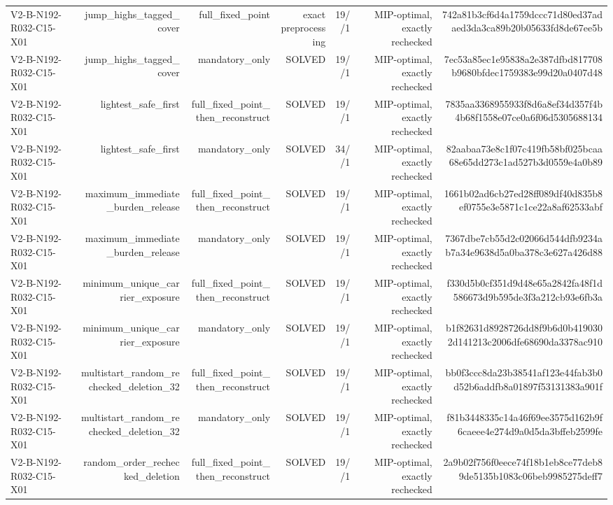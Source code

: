 {\begin{longtable}{lrrrrrr}
V2-B-N192-R032-C15-X01 & jump\_highs\_tagged\_cover & full\_fixed\_point & exact preprocessing & 19//1 & MIP-optimal, exactly rechecked & 742a81b3cf6d4a1759dccc71d80ed37adaed3da3ca89b20b05633fd8de67ee5b \\
V2-B-N192-R032-C15-X01 & jump\_highs\_tagged\_cover & mandatory\_only & SOLVED & 19//1 & MIP-optimal, exactly rechecked & 7ec53a85ec1e95838a2e387dfbd817708b9680bfdec1759383e99d20a0407d48 \\
V2-B-N192-R032-C15-X01 & lightest\_safe\_first & full\_fixed\_point\_then\_reconstruct & SOLVED & 19//1 & MIP-optimal, exactly rechecked & 7835aa3368955933f8d6a8ef34d357f4b4b68f1558e07ce0a6f06d5305688134 \\
V2-B-N192-R032-C15-X01 & lightest\_safe\_first & mandatory\_only & SOLVED & 34//1 & MIP-optimal, exactly rechecked & 82aabaa73e8c1f07c419fb58bf025bcaa68e65dd273c1ad527b3d0559e4a0b89 \\
V2-B-N192-R032-C15-X01 & maximum\_immediate\_burden\_release & full\_fixed\_point\_then\_reconstruct & SOLVED & 19//1 & MIP-optimal, exactly rechecked & 1661b02ad6cb27ed28ff089df40d835b8ef0755e3e5871c1ce22a8af62533abf \\
V2-B-N192-R032-C15-X01 & maximum\_immediate\_burden\_release & mandatory\_only & SOLVED & 19//1 & MIP-optimal, exactly rechecked & 7367dbe7cb55d2c02066d544dfb9234ab7a34e9638d5a0ba378c3e627a426d88 \\
V2-B-N192-R032-C15-X01 & minimum\_unique\_carrier\_exposure & full\_fixed\_point\_then\_reconstruct & SOLVED & 19//1 & MIP-optimal, exactly rechecked & f330d5b0cf351d9d48e65a2842fa48f1d586673d9b595de3f3a212cb93e6fb3a \\
V2-B-N192-R032-C15-X01 & minimum\_unique\_carrier\_exposure & mandatory\_only & SOLVED & 19//1 & MIP-optimal, exactly rechecked & b1f82631d8928726dd8f9b6d0b4190302d141213c2006dfe68690da3378ac910 \\
V2-B-N192-R032-C15-X01 & multistart\_random\_rechecked\_deletion\_32 & full\_fixed\_point\_then\_reconstruct & SOLVED & 19//1 & MIP-optimal, exactly rechecked & bb0f3ccc8da23b38541af123e44fab3b0d52b6addfb8a01897f53131383a901f \\
V2-B-N192-R032-C15-X01 & multistart\_random\_rechecked\_deletion\_32 & mandatory\_only & SOLVED & 19//1 & MIP-optimal, exactly rechecked & f81b3448335c14a46f69ee3575d162b9f6caeee4e274d9a0d5da3bffeb2599fe \\
V2-B-N192-R032-C15-X01 & random\_order\_rechecked\_deletion & full\_fixed\_point\_then\_reconstruct & SOLVED & 19//1 & MIP-optimal, exactly rechecked & 2a9b02f756f0eece74f18b1eb8ce77deb89de5135b1083c06beb9985275deff7 \\

\end{longtable}}

